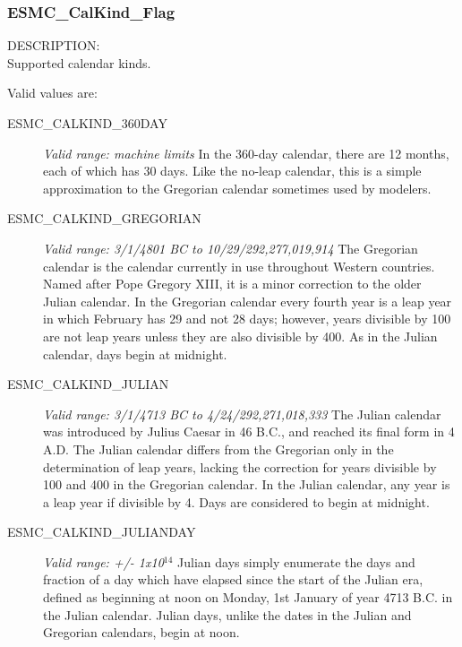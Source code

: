 
\label{subsec:Calendar_options}

\subsubsection{ESMC\_CalKind\_Flag}
\label{opt:calkindflag}


{\sf DESCRIPTION:\\}
Supported calendar kinds.

Valid values are:
\begin{description}
      
\item [ESMC\_CALKIND\_360DAY] 
{\it Valid range: machine limits} 
\newline In the 360-day calendar, there are 12 months, each of which has 30 days.  
Like the no-leap calendar, this is a simple approximation to the Gregorian
calendar sometimes used by modelers.

\item [ESMC\_CALKIND\_GREGORIAN] 
{\it Valid range: 3/1/4801 BC to 10/29/292,277,019,914 }
\newline The Gregorian calendar is the calendar currently in use 
throughout Western countries.  Named after Pope Gregory XIII, it is a minor 
correction to the older Julian calendar. In the Gregorian calendar every
fourth year is a leap year in which February has 29 and not 28 days;
however, years divisible by 100 are not leap years unless they are also 
divisible  by 400.  As in the Julian calendar, days begin at midnight.

\item [ESMC\_CALKIND\_JULIAN]
{\it Valid range: 3/1/4713 BC to 4/24/292,271,018,333 } 
\newline The Julian calendar was introduced by Julius Caesar in 46 B.C., and 
reached its final form in 4 A.D.  The Julian calendar differs from the 
Gregorian only in the determination of leap years, lacking the correction 
for years divisible by 100 and 400 in the Gregorian calendar.  In the Julian 
calendar, any year is a leap year if divisible by 4.  Days are considered to 
begin at midnight.

\item [ESMC\_CALKIND\_JULIANDAY] 
{\it Valid range:  +/- 1x10$^{14}$} 
\newline Julian days simply enumerate the days and fraction of a day which 
have elapsed since the start of the Julian era, defined as beginning at noon 
on Monday, 1st January of year 4713 B.C. in the Julian calendar.  Julian days, 
unlike the dates in the Julian and Gregorian calendars, begin at noon.


\end{description}
